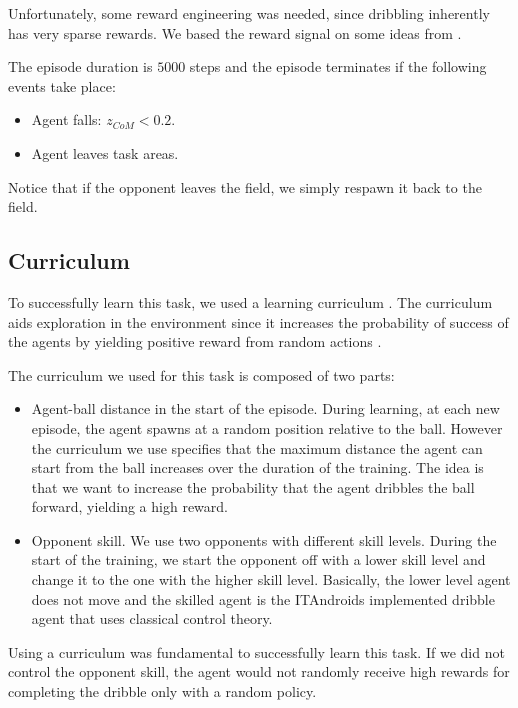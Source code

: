 Unfortunately, some reward engineering was needed, since dribbling inherently has very sparse rewards.
We based the reward signal on some ideas from .

The episode duration is $5000$ steps and the episode terminates if the following events take place: 

\begin{itemize}
    \item Agent falls: $z_{CoM} < 0.2$.
    \item Agent leaves task areas.
\end{itemize}

Notice that if the opponent leaves the field, we simply respawn it back to the field.

\subsection{Curriculum}

To successfully learn this task, we used a learning curriculum \cite{BengioCurrLearning}.
The curriculum aids exploration in the environment since it increases the probability of success of
the agents by yielding positive reward from random actions \cite{OpenAISelfPlay}.

The curriculum we used for this task is composed of two parts:

\begin{itemize}
    \item Agent-ball distance in the start of the episode. During learning, at each new episode, the agent spawns at a random position relative 
    to the ball. However the curriculum we use specifies that the maximum distance the agent can start from the ball increases
    over the duration of the training.
    The idea is that we want to increase the probability that the agent dribbles the ball forward, yielding a high reward.
    \item Opponent skill. We use two opponents with different skill levels. During the start of the training,
    we start the opponent off with a lower skill level and change it to the one with the higher skill level.
    Basically, the lower level agent does not move and the skilled agent is the ITAndroids implemented
    dribble agent that uses classical control theory.
\end{itemize}

Using a curriculum was fundamental to successfully learn this task. If we did not control the opponent
skill, the agent would not randomly receive high rewards for completing the dribble only with a 
random policy.
